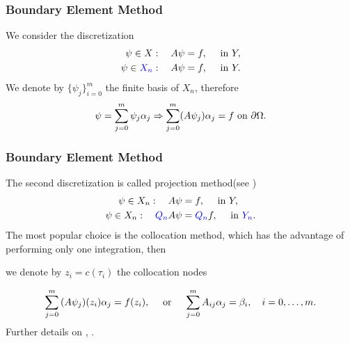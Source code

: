 \documentclass[handout]{beamer}
\newcommand{\upon}{\textup{ on }}
\begin{document}
\begin{frame}
 \frametitle{Boundary Element Method}
 We consider the discretization
  \begin{align}
  \psi\in X:\quad A\psi&=f,\quad\textup{ in }Y,\\
  \psi\in {\color{blue}X_n}:\quad A\psi&=f,\quad\textup{ in }Y.
  \end{align}
\pause
We denote by $\{\psi_j\}_{i=0}^m$ the finite basis of $X_n$, 
therefore
\begin{equation}
 \psi=\sum_{j=0}^m\psi_j\alpha_j\Rightarrow\sum_{j=0}^m(A\psi_j) \alpha_j = f \upon \partial\Omega.\label{eq:directlinear}
\end{equation}
\end{frame}
\begin{frame}
 \frametitle{Boundary Element Method}
 The second discretization is called {\color{blue}projection method}(see \cite{kirsch:book})
  \begin{align}
  \psi\in {X_n}:\quad A\psi&=f,\quad\textup{ in }Y, \\
  \psi\in {X_n}:\quad {\color{blue}Q_n}A\psi&={\color{blue}Q_n}f,\quad\textup{ in }{\color{blue}Y_n}.
  \end{align}
\pause
The most popular choice is the {\color{blue}collocation method}, which has the advantage of 
performing only one integration, then
\begin{center}
 we denote by $z_i = c(\tau_i)$ the collocation nodes
\end{center}
\begin{equation}
 \sum_{j=0}^m{(A\psi_j)(z_i)} \alpha_j = {f(z_i)}, 
 \quad \textup{ or }\quad \sum_{j=0}^m{A_{ij}}\alpha_j = {\beta_i}, 
 \quad i=0,\dots,m.\label{eq:bie-collocated}
\end{equation}
Further details on \cite{brebbia:book}, \cite{brebbia:book-progress}.
\end{frame}
\end{document}
